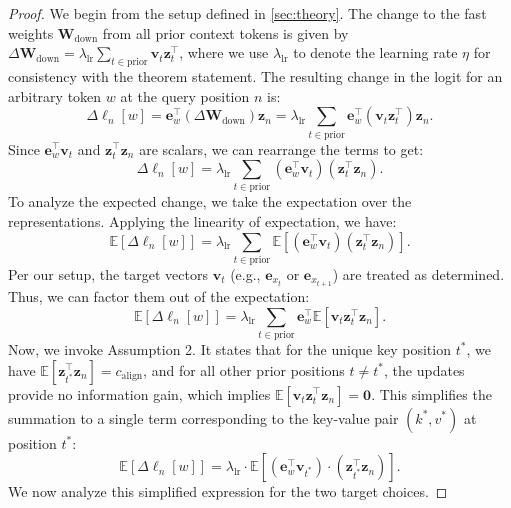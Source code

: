 \begin{proof}
We begin from the setup defined in \cref{sec:theory}. The change to the fast weights $\mathbf{W}_{\mathrm{down}}$ from all prior context tokens is given by $\Delta \mathbf{W}_{\mathrm{down}} = \lambda_{\text{lr}} \sum_{t \in \text{prior}} \mathbf{v}_t \mathbf{z}_t^\top$, where we use $\lambda_{\text{lr}}$ to denote the learning rate $\eta$ for consistency with the theorem statement. The resulting change in the logit for an arbitrary token $w$ at the query position $n$ is:
\begin{equation}
\Delta \boldsymbol{\ell}_{n}[w] = \mathbf{e}_w^\top (\Delta \mathbf{W}_{\mathrm{down}}) \mathbf{z}_{n} = \lambda_{\text{lr}} \sum_{t \in \text{prior}} \mathbf{e}_w^\top (\mathbf{v}_t \mathbf{z}_t^\top) \mathbf{z}_n.
\end{equation}
Since $\mathbf{e}_w^\top \mathbf{v}_t$ and $\mathbf{z}_t^\top \mathbf{z}_n$ are scalars, we can rearrange the terms to get:
\begin{equation}
\Delta \boldsymbol{\ell}_{n}[w] = \lambda_{\text{lr}} \sum_{t \in \text{prior}} (\mathbf{e}_w^\top \mathbf{v}_t) (\mathbf{z}_t^\top \mathbf{z}_n).
\end{equation}
To analyze the expected change, we take the expectation over the representations. Applying the linearity of expectation, we have:
\begin{equation}
\mathbb{E}[\Delta \boldsymbol{\ell}_{n}[w]] = \lambda_{\text{lr}} \sum_{t \in \text{prior}} \mathbb{E}[(\mathbf{e}_w^\top \mathbf{v}_t) (\mathbf{z}_t^\top \mathbf{z}_n)].
\end{equation}
Per our setup, the target vectors $\mathbf{v}_t$ (e.g., $\mathbf{e}_{x_t}$ or $\mathbf{e}_{x_{t+1}}$) are treated as determined. Thus, we can factor them out of the expectation:
\begin{equation}
\mathbb{E}[\Delta \boldsymbol{\ell}_{n}[w]] = \lambda_{\text{lr}} \sum_{t \in \text{prior}} \mathbf{e}_w^\top \mathbb{E}[\mathbf{v}_t \mathbf{z}_t^\top \mathbf{z}_n].
\end{equation}
Now, we invoke Assumption 2. It states that for the unique key position $t^*$, we have $\mathbb{E}[\mathbf{z}_{t^*}^\top \mathbf{z}_n] = c_{\text{align}}$, and for all other prior positions $t \neq t^*$, the updates provide no information gain, which implies $\mathbb{E}[\mathbf{v}_t \mathbf{z}_t^\top \mathbf{z}_n]=\mathbf{0}$. This simplifies the summation to a single term corresponding to the key-value pair $(k^*, v^*)$ at position $t^*$:
\begin{equation}
\label{eq:app-simplified-form}
\mathbb{E}\left[\Delta \boldsymbol{\ell}_{n}[w]\right] = \lambda_{\text{lr}} \cdot \mathbb{E}\left[(\mathbf{e}_w^\top \mathbf{v}_{t^*}) \cdot (\mathbf{z}_{t^*}^\top \mathbf{z}_n)\right].
\end{equation}
We now analyze this simplified expression for the two target choices.


\end{proof}
